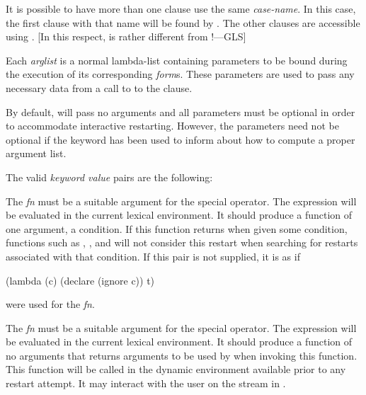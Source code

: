 \begin{defmac}
  It is possible to have more than one clause use the same \emph{case-name}.
  In this case, the first clause with that name will be found by
  . The other clauses are accessible using .
  [In this respect,  is rather different from !---GLS]

  Each \emph{arglist} is a normal lambda-list containing parameters
  to be bound during the execution of 
  its corresponding \emph{form\/}s. These parameters are used to pass any necessary 
  data from a call to  to the  clause.

  By default,  will pass no arguments and
  all parameters must be optional in order to accommodate interactive
  restarting. However, the parameters need not be optional if the
   keyword has been used to inform 
  about how to compute a proper argument list.

  The valid \emph{keyword value} pairs are the following:
\begin{flushdesc}
\item[\cd{:test \emph{fn}}]

    The \emph{fn} must be a suitable argument for the  special operator. The
    expression  will be evaluated in the current lexical
    environment. It should produce a function of one argument, a condition.
    If this function returns  when given some condition, functions such as
, , and 
will not consider this restart when searching for restarts associated with
that condition.  If this pair is not supplied, it is as if
\begin{lisp}
(lambda (c) (declare (ignore c)) t)
\end{lisp}
were used for the \emph{fn}.

\item[\cd{:interactive \emph{fn}}]

    The \emph{fn} must be a suitable argument for the  special operator. The
    expression  will be evaluated in the current lexical
    environment. It should produce a function of no arguments that 
    returns arguments to be used by  when
    invoking this function. This function will be called in the dynamic
    environment available prior to any restart attempt. It may interact with the user
    on the stream in .


\end{flushdesc}
\end{defmac}
